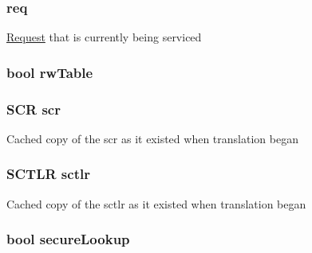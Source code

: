 \hypertarget{classArmISA_1_1TableWalker_1_1WalkerState_a956cd41d82347558b9c0a5b0474903f2}{
\subsubsection[{req}]{ {\bf req}}}
\label{classArmISA_1_1TableWalker_1_1WalkerState_a956cd41d82347558b9c0a5b0474903f2}
\hyperlink{classRequest}{Request} that is currently being serviced \hypertarget{classArmISA_1_1TableWalker_1_1WalkerState_a419a9be86581a6eba5d7f4a22f0f6e76}{
\subsubsection[{rwTable}]{\setlength{\rightskip}{0pt plus 5cm}bool {\bf rwTable}}}
\label{classArmISA_1_1TableWalker_1_1WalkerState_a419a9be86581a6eba5d7f4a22f0f6e76}
\hypertarget{classArmISA_1_1TableWalker_1_1WalkerState_ace0bf26677706ecff809bd4c76d33c8c}{
\subsubsection[{scr}]{\setlength{\rightskip}{0pt plus 5cm}SCR {\bf scr}}}
\label{classArmISA_1_1TableWalker_1_1WalkerState_ace0bf26677706ecff809bd4c76d33c8c}
Cached copy of the scr as it existed when translation began \hypertarget{classArmISA_1_1TableWalker_1_1WalkerState_a43c4d132ca97c6cc5358f7be3c2b5a69}{
\subsubsection[{sctlr}]{\setlength{\rightskip}{0pt plus 5cm}SCTLR {\bf sctlr}}}
\label{classArmISA_1_1TableWalker_1_1WalkerState_a43c4d132ca97c6cc5358f7be3c2b5a69}
Cached copy of the sctlr as it existed when translation began \hypertarget{classArmISA_1_1TableWalker_1_1WalkerState_aa8accf2e55a1d194420c61e85b53efb5}{
\subsubsection[{secureLookup}]{\setlength{\rightskip}{0pt plus 5cm}bool {\bf secureLookup}}}

